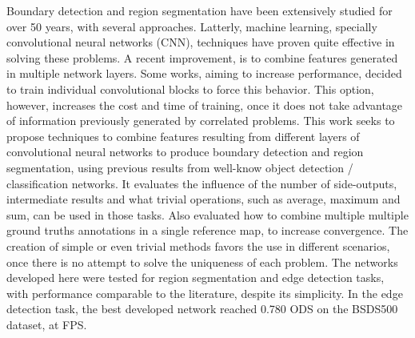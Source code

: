 Boundary detection and region segmentation have been extensively studied for over 50 years, with several approaches.
Latterly, machine learning, specially convolutional neural networks (CNN), techniques have proven quite effective in solving these problems.
A recent improvement, is to combine features generated in multiple network layers. 
Some works, aiming to increase performance, decided to train individual convolutional blocks to force this behavior.
This option, however, increases the cost and time of training, once it does not take advantage of information previously generated by correlated problems.
This work seeks to propose techniques to combine features resulting from different layers of convolutional neural networks to produce boundary detection and region segmentation, using previous results from well-know object detection / classification networks.
It evaluates the influence of the number of side-outputs, intermediate results and what trivial operations, such as average, maximum and sum, can be used in those tasks.
Also evaluated how to combine multiple multiple ground truths annotations in a single reference map, to increase convergence.
The creation of simple or even trivial methods favors the use in different scenarios, once there is no attempt to solve the uniqueness of each problem.
The networks developed here were tested for region segmentation and edge detection tasks, with performance comparable to the literature, despite its simplicity.
In the edge detection task, the best developed network reached 0.780 ODS on the BSDS500 dataset, at \myFPS FPS.
